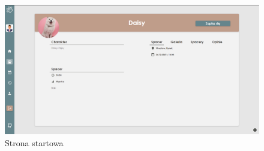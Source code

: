 \begin{figure}[H]
  \centering
  \includegraphics[width=1\linewidth]{rysunki/walker-4.PNG}
  \caption{Strona startowa}
  \label{fig:walker-landing-page}
\end{figure}

